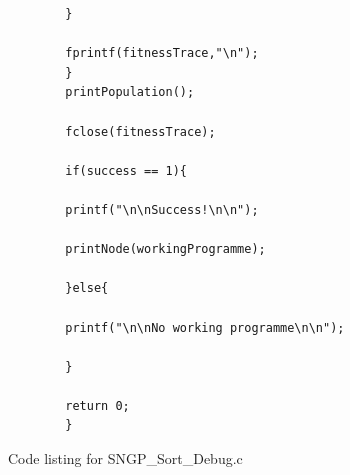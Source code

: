 \documentclass{article}
\begin{document}
\begin{lstlisting}
	    }
	    
	    fprintf(fitnessTrace,"\n");
	    }
	    printPopulation();
	    
	    fclose(fitnessTrace);
	    
	    if(success == 1){
	    
	    printf("\n\nSuccess!\n\n");
	    
	    printNode(workingProgramme);
	    
	    }else{
	    
	    printf("\n\nNo working programme\n\n");
	    
	    }
	    
	    return 0;
	    }
	    \end{lstlisting}
	    
	    Code listing for SNGP\_Sort\_Debug.c
	    
\end{document}
